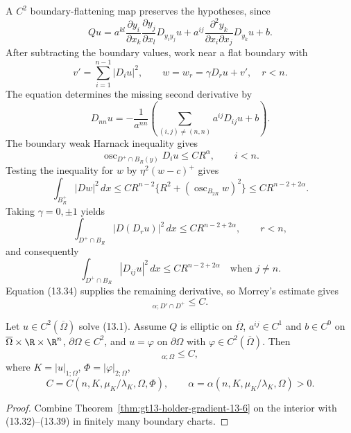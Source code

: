 A $C^2$ boundary-flattening map preserves the hypotheses, since
\begin{equation}
Qu=a^{kl}\frac{\partial y_i}{\partial x_k}
\frac{\partial y_j}{\partial x_l}D_{y_iy_j}u
+a^{ij}\frac{\partial^2y_k}{\partial x_i\partial x_j}D_{y_k}u+b.
\tag{13.32}
\end{equation}
After subtracting the boundary values, work near a flat boundary with
\begin{equation}
v'=\sum_{i=1}^{n-1}|D_iu|^2,
\qquad w=w_r=\gamma D_ru+v',\quad r<n.
\tag{13.33}
\end{equation}
The equation determines the missing second derivative by
\begin{equation}
D_{nn}u=-\frac1{a^{nn}}
\left(\sum_{(i,j)\ne(n,n)}a^{ij}D_{ij}u+b\right).
\tag{13.34}
\end{equation}
The boundary weak Harnack inequality gives
\begin{equation}
\operatorname{osc}_{D^+\cap B_R(y)}D_iu\le CR^\alpha,
\qquad i<n.
\tag{13.35}
\end{equation}
Testing the inequality for $w$ by $\eta^2(w-c)^+$ gives
\begin{equation}
\int_{B_R^+}|Dw|^2\,dx
\le CR^{n-2}\{R^2+(\operatorname{osc}_{B_{2R}}w)^2\}
\le CR^{n-2+2\alpha}.
\tag{13.36}
\end{equation}
Taking $\gamma=0,\pm1$ yields
\begin{equation}
\int_{D^+\cap B_R}|D(D_ru)|^2\,dx\le CR^{n-2+2\alpha},
\qquad r<n,
\tag{13.37}
\end{equation}
and consequently
\begin{equation}
\int_{D^+\cap B_R}|D_{ij}u|^2\,dx\le CR^{n-2+2\alpha}
\quad\text{when }j\ne n.
\tag{13.38}
\end{equation}
Equation \textup{(13.34)} supplies the remaining derivative, so Morrey's
estimate gives
\begin{equation}
[Du]_{\alpha;D'\cap D^+}\le C.
\tag{13.39}
\end{equation}

\begin{theorem}
\label{thm:gt13-holder-gradient-13-7}
Let $u\in C^2(\overline\Omega)$ solve \textup{(13.1)}.  Assume $Q$ is
elliptic on $\overline\Omega$, $a^{ij}\in C^1$ and $b\in C^0$ on
$\overline\Omega\times\R\times\R^n$, $\partial\Omega\in C^2$, and
$u=\varphi$ on $\partial\Omega$ with
$\varphi\in C^2(\overline\Omega)$.  Then
\begin{equation}
[Du]_{\alpha;\Omega}\le C,
\tag{13.40}
\end{equation}
where $K=|u|_{1;\Omega}$, $\Phi=|\varphi|_{2;\Omega}$,
\[
C=C(n,K,\mu_K/\lambda_K,\Omega,\Phi),
\qquad
\alpha=\alpha(n,K,\mu_K/\lambda_K,\Omega)>0.
\]
\end{theorem}
\begin{proof}
\sketch Combine Theorem~\ref{thm:gt13-holder-gradient-13-6} on the interior
with \textup{(13.32)--(13.39)} in finitely many boundary charts.
\end{proof}

